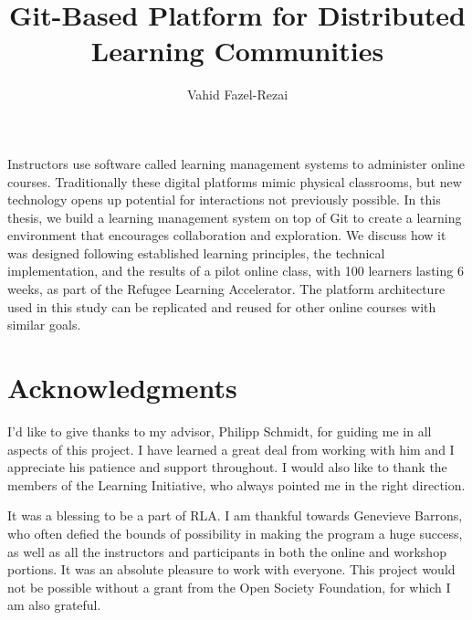 \documentclass[12pt,twoside]{mitthesis}
\begin{document}
\title{Git-Based Platform for Distributed Learning Communities}
\author{Vahid Fazel-Rezai}
\maketitle
\cleardoublepage
\setcounter{savepage}{\thepage}
\begin{abstractpage}
Instructors use software called learning management systems to administer online courses. Traditionally these digital platforms mimic physical classrooms, but new technology opens up potential for interactions not previously possible. In this thesis, we build a learning management system on top of Git to create a learning environment that encourages collaboration and exploration. We discuss how it was designed following established learning principles, the technical implementation, and the results of a pilot online class, with 100 learners lasting 6 weeks, as part of the Refugee Learning Accelerator. The platform architecture used in this study can be replicated and reused for other online courses with similar goals.
\end{abstractpage}
\cleardoublepage
\section*{Acknowledgments}
I'd like to give thanks to my advisor, Philipp Schmidt, for guiding me in all aspects of this project. I have learned a great deal from working with him and I appreciate his patience and support throughout. I would also like to thank the members of the Learning Initiative, who always pointed me in the right direction.

It was a blessing to be a part of RLA. I am thankful towards Genevieve Barrons, who often defied the bounds of possibility in making the program a huge success, as well as all the instructors and participants in both the online and workshop portions. It was an absolute pleasure to work with everyone. This project would not be possible without a grant from the Open Society Foundation, for which I am also grateful.

\tableofcontents
\end{document}
